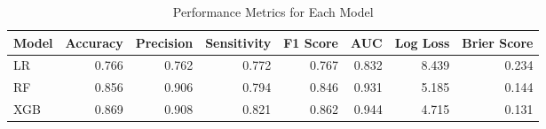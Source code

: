 \begin{table}[H]\centering
\caption{Performance Metrics for Each Model}
\label{Table 3 :performance_metrics}
\begin{tabular}{lrrrrrrr}
\toprule
Model & Accuracy & Precision & Sensitivity & F1 Score & AUC & Log Loss & Brier Score \\
\midrule
LR & 0.766 & 0.762 & 0.772 & 0.767 & 0.832 & 8.439 & 0.234 \\
RF & 0.856 & 0.906 & 0.794 & 0.846 & 0.931 & 5.185 & 0.144 \\
XGB & 0.869 & 0.908 & 0.821 & 0.862 & 0.944 & 4.715 & 0.131 \\
\bottomrule
\end{tabular}
\end{table}
